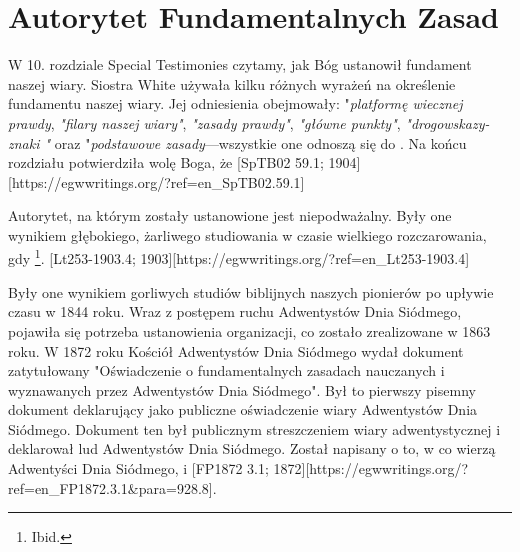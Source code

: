 
\chapter{Autorytet Fundamentalnych Zasad} \label{chap:authority}

W 10. rozdziale Special Testimonies czytamy, jak Bóg ustanowił fundament naszej wiary. Siostra White używała kilku różnych wyrażeń na określenie fundamentu naszej wiary. Jej odniesienia obejmowały: "\textit{platformę wiecznej prawdy}, \textit{"filary naszej wiary"}, \textit{"zasady prawdy"}, \textit{"główne punkty"}, \textit{"drogowskazy- znaki "} oraz "\textit{podstawowe zasady}—wszystkie one odnoszą się do . Na końcu rozdziału potwierdziła wolę Boga, że [SpTB02 59.1; 1904][https://egwwritings.org/?ref=en\_SpTB02.59.1]

Autorytet, na którym zostały ustanowione  jest niepodważalny. Były one wynikiem głębokiego, żarliwego studiowania w czasie wielkiego rozczarowania, gdy \footnote{Ibid.}. [Lt253-1903.4; 1903][https://egwwritings.org/?ref=en\_Lt253-1903.4]

Były one wynikiem gorliwych studiów biblijnych naszych pionierów po upływie czasu w 1844 roku. Wraz z postępem ruchu Adwentystów Dnia Siódmego, pojawiła się potrzeba ustanowienia organizacji, co zostało zrealizowane w 1863 roku. W 1872 roku Kościół Adwentystów Dnia Siódmego wydał dokument zatytułowany "Oświadczenie o fundamentalnych zasadach nauczanych i wyznawanych przez Adwentystów Dnia Siódmego". Był to pierwszy pisemny dokument deklarujący  jako publiczne oświadczenie wiary Adwentystów Dnia Siódmego. Dokument ten był publicznym streszczeniem wiary adwentystycznej i deklarował  lud Adwentystów Dnia Siódmego. Został napisany  o to, w co wierzą Adwentyści Dnia Siódmego,  i [FP1872 3.1; 1872][https://egwwritings.org/?ref=en\_FP1872.3.1&para=928.8].

